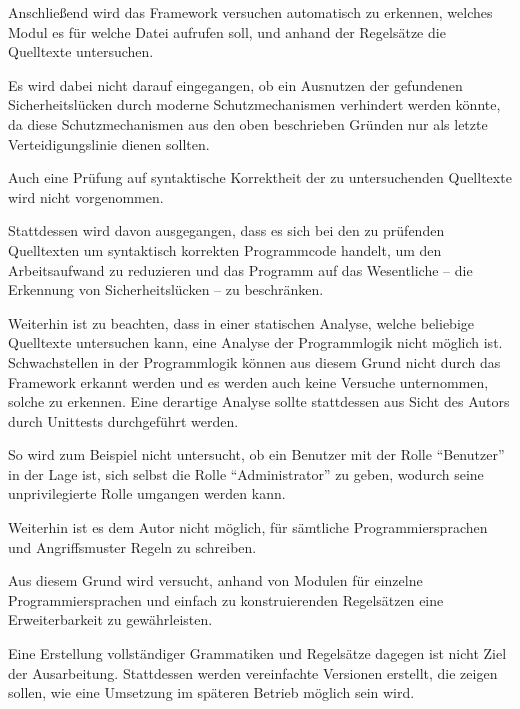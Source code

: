         Anschließend wird das Framework versuchen automatisch zu erkennen,
        welches Modul es für welche Datei aufrufen soll,
        und
        anhand der Regelsätze die Quelltexte untersuchen.

        Es wird dabei nicht darauf eingegangen,
        ob ein Ausnutzen der gefundenen Sicherheitslücken durch moderne Schutzmechanismen verhindert werden könnte,
        da diese Schutzmechanismen aus den oben beschrieben Gründen nur als letzte Verteidigungslinie dienen sollten.

        Auch eine Prüfung auf syntaktische Korrektheit der zu untersuchenden Quelltexte wird nicht vorgenommen.

        Stattdessen wird davon ausgegangen,
        dass es sich bei den zu prüfenden Quelltexten um syntaktisch korrekten Programmcode handelt,
        um den Arbeitsaufwand zu reduzieren und
        das Programm auf das Wesentliche
        -- die Erkennung von Sicherheitslücken
        -- zu beschränken.

        Weiterhin ist zu beachten,
        dass in einer statischen Analyse,
        welche beliebige Quelltexte untersuchen kann,
        eine Analyse der Programmlogik nicht möglich ist.
        Schwachstellen in der Programmlogik können aus diesem Grund nicht durch das Framework erkannt werden und
        es werden auch keine Versuche unternommen,
        solche zu erkennen.
        Eine derartige Analyse sollte stattdessen aus Sicht des Autors durch Unittests durchgeführt werden.

        So wird zum Beispiel nicht untersucht,
        ob ein Benutzer mit der Rolle
        \enquote{Benutzer} in der Lage ist,
        sich selbst die Rolle
        \enquote{Administrator} zu geben,
        wodurch seine unprivilegierte Rolle umgangen werden kann.

        Weiterhin ist es dem Autor nicht möglich,
        für sämtliche Programmiersprachen und
        Angriffsmuster Regeln zu schreiben.

        Aus diesem Grund wird versucht,
        anhand von Modulen für einzelne Programmiersprachen und
        einfach zu konstruierenden Regelsätzen eine Erweiterbarkeit zu gewährleisten.

        Eine Erstellung vollständiger Grammatiken und
        Regelsätze dagegen ist nicht Ziel der Ausarbeitung.
        Stattdessen werden vereinfachte Versionen erstellt,
        die zeigen sollen,
        wie eine Umsetzung im späteren Betrieb möglich sein wird.

